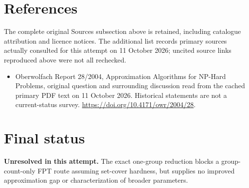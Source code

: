 \documentclass[11pt]{article}
\begin{document}
\section{References}
The complete original Sources subsection above is retained, including catalogue attribution and licence notices. The additional list records primary sources actually consulted for this attempt on 11 October 2026; uncited source links reproduced above were not all rechecked.
\begin{itemize}
\item Oberwolfach Report 28/2004, Approximation Algorithms for NP-Hard Problems, original question and surrounding discussion read from the cached primary PDF text on 11 October 2026. Historical statements are not a current-status survey. \url{https://doi.org/10.4171/owr/2004/28}.
\end{itemize}
\section{Final status}
\textbf{Unresolved in this attempt.} The exact one-group reduction blocks a group-count-only FPT route assuming set-cover hardness, but supplies no improved approximation gap or characterization of broader parameters.
\end{document}
